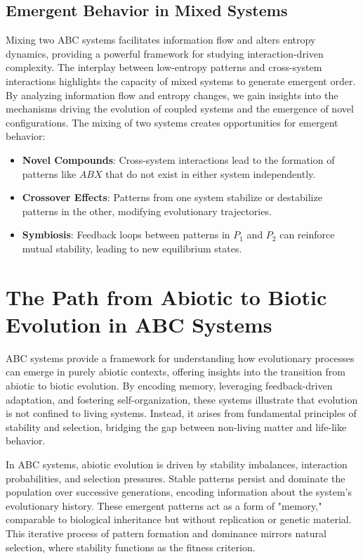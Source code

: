 \documentclass[entropy,article,submit,pdftex,moreauthors]{Definitions/mdpi}
\begin{document}
\subsection{Emergent Behavior in Mixed Systems}

Mixing two ABC systems facilitates information flow and alters entropy dynamics, providing a powerful framework for studying interaction-driven complexity. The interplay between low-entropy patterns and cross-system interactions highlights the capacity of mixed systems to generate emergent order. By analyzing information flow and entropy changes, we gain insights into the mechanisms driving the evolution of coupled systems and the emergence of novel configurations. The mixing of two systems creates opportunities for emergent behavior:
\begin{itemize}
    \item \textbf{Novel Compounds}: Cross-system interactions lead to the formation of patterns like \( ABX \) that do not exist in either system independently.
    \item \textbf{Crossover Effects}: Patterns from one system stabilize or destabilize patterns in the other, modifying evolutionary trajectories.
    \item \textbf{Symbiosis}: Feedback loops between patterns in \( P_1 \) and \( P_2 \) can reinforce mutual stability, leading to new equilibrium states.
\end{itemize}

\section{The Path from Abiotic to Biotic Evolution in ABC Systems}

ABC systems provide a framework for understanding how evolutionary processes can emerge in purely abiotic contexts, offering insights into the transition from abiotic to biotic evolution. By encoding memory, leveraging feedback-driven adaptation, and fostering self-organization, these systems illustrate that evolution is not confined to living systems. Instead, it arises from fundamental principles of stability and selection, bridging the gap between non-living matter and life-like behavior.

In ABC systems, abiotic evolution is driven by stability imbalances, interaction probabilities, and selection pressures. Stable patterns persist and dominate the population over successive generations, encoding information about the system’s evolutionary history. These emergent patterns act as a form of "memory," comparable to biological inheritance but without replication or genetic material. This iterative process of pattern formation and dominance mirrors natural selection, where stability functions as the fitness criterion.
\end{document}
